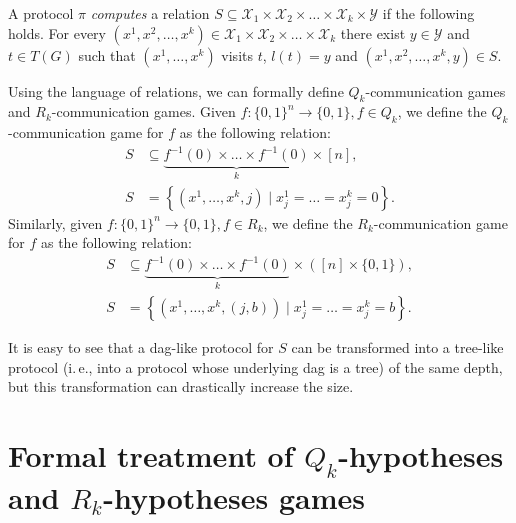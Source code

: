 \documentclass[11pt]{article}
\numberwithin{equation}{section}
\theoremstyle{definition}
\theoremstyle{plain}
\newcommand{\ie}{i.\,e.}
\begin{document}
A protocol $\pi$ \emph{computes} a relation $S\subseteq \mathcal{X}_1\times\mathcal{X}_2\times\ldots\times \mathcal{X}_k\times\mathcal{Y}$ if the following holds. For every $(x^1, x^2, \ldots, x^k) \in  \mathcal{X}_1\times\mathcal{X}_2\times\ldots\times \mathcal{X}_k$ there exist $y\in \mathcal{Y}$ and $t\in T(G)$ such that $(x^1, \ldots, x^k)$ visits $t$, $l(t) = y$ and $(x^1, x^2, \ldots, x^k, y) \in S$.

Using the language of relations, we can formally define $Q_k$-communication games and $R_k$-communication games.  %
Given  %
$f\colon\{0, 1\}^n\to\{0,1\}, f\in Q_k$, we define the $Q_k$-communication game for $f$ as the following relation:
\begin{align*}
S &\subseteq \underbrace{f^{-1}(0) \times \ldots \times f^{-1}(0)}_k \times [n], \\
 S &= \left\{(x^1, \ldots, x^k, j) \mid x^1_j  = \ldots = x^k_j = 0\right\}.
\end{align*}
Similarly, given $f\colon\{0, 1\}^n\to\{0,1\}, f\in R_k$, we define the $R_k$-communication game for $f$ as the following relation:
\begin{align*}
S &\subseteq \underbrace{f^{-1}(0) \times \ldots \times f^{-1}(0)}_k \times ([n]\times\{0,1\}), \\
 S &= \left\{(x^1, \ldots, x^k, (j, b)) \mid x^1_j  = \ldots = x^k_j = b\right\}.
\end{align*}

It is easy to see that a dag-like protocol for $S$ can be transformed into a tree-like protocol (\ie, into a protocol whose underlying dag is a tree) of the same depth, but this transformation can drastically increase the size.


\section{Formal treatment of $Q_k$-hypotheses and $R_k$-hypotheses games} 
\label{sec:hypotheses_games}
\end{document}
